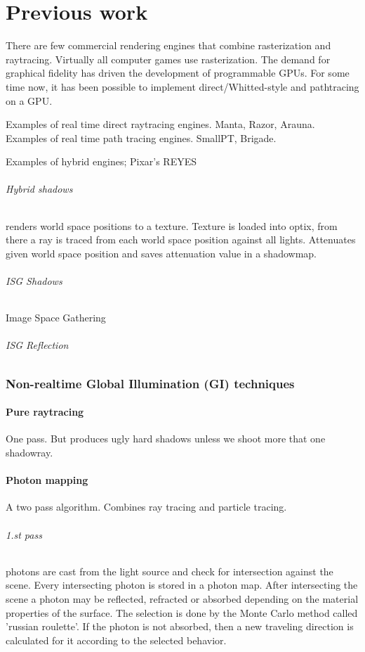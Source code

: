 \part{Previous work}

There are few commercial rendering engines that combine rasterization and raytracing. Virtually all computer games use rasterization. The demand for graphical fidelity has driven the development of programmable GPUs. For some time now, it has been possible to implement direct/Whitted-style and pathtracing on a GPU.

Examples of real time direct raytracing engines. Manta, Razor, Arauna.
Examples of real time path tracing engines. SmallPT, Brigade.

Examples of hybrid engines; Pixar's REYES

\paragraph{Hybrid shadows} renders world space positions to a texture. Texture is loaded into optix, from there a ray is traced from each world space position against all lights. Attenuates given world space position and saves attenuation value in a shadowmap.

\paragraph{ISG Shadows} Image Space Gathering \cite{nvidiarobison09}
\paragraph{ISG Reflection}


\section {Non-realtime Global Illumination (GI) techniques}
		\subsection{Pure raytracing} 
		One pass. But produces ugly hard shadows unless we shoot more that one shadowray.
	\subsection{Photon mapping} A two pass algorithm. Combines ray tracing and particle tracing.
		\paragraph{1.st pass} photons are cast from the light source and check for intersection against the scene.    Every intersecting photon is stored in a photon map. After intersecting the scene a photon may be reflected, refracted or absorbed depending on the material properties of the surface. The selection is done by the Monte Carlo method called 'russian roulette'. If the photon is not absorbed, then a new traveling direction is calculated for it according to the selected behavior.
			

